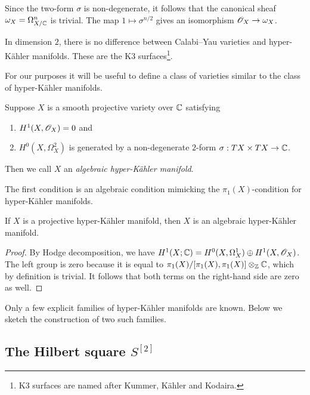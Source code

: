 \begin{remark}
Since the two-form $\sigma$ is non-degenerate, it follows that the canonical sheaf $\omega_X=\Omega_{X/\mathbb{C}}^n$ is trivial. The map $1 \mapsto \sigma^{n/2}$ gives an isomorphism $\mathscr{O}_X \to \omega_X$. 
\end{remark}

\begin{remark}
In dimension $2$, there is no difference between Calabi--Yau varieties and hyper-Kähler manifolds. These are the K3 surfaces\footnote{K3 surfaces are named after Kummer, Kähler and Kodaira.}. 
\end{remark}


For our purposes it will be useful to define a class of varieties similar to the class of hyper-Kähler manifolds.

\begin{definition}
Suppose $X$ is a smooth projective variety over $\mathbb{C}$ satisfying

\begin{enumerate}
\item $H^1(X,\mathscr{O}_X)=0$ and
\item $H^0(X,\Omega_X^2)$ is generated by a non-degenerate $2$-form $\sigma:TX \times TX \to \mathbb{C}$.
\end{enumerate}

Then we call $X$ an \emph{algebraic hyper-Kähler manifold}.
\end{definition}

The first condition is an algebraic condition mimicking the $\pi_1(X)$-condition for hyper-Kähler manifolds.

\begin{proposition}
If $X$ is a projective hyper-Kähler manifold, then $X$ is an algebraic hyper-Kähler manifold.
\end{proposition}
\begin{proof}
By Hodge decomposition, we have $H^1(X;\mathbb{C}) = H^0(X,\Omega^1_X) \oplus H^1(X,\mathscr{O}_X)$. The left group is zero because it is equal to $\pi_1(X)/[\pi_1(X),\pi_1(X)] \otimes_{\mathbb{Z}} \mathbb{C}$, which by definition is trivial. It follows that both terms on the right-hand side are zero as well.
\end{proof}

Only a few explicit families of hyper-Kähler manifolds are known. Below we sketch the construction of two such families.

\subsection{The Hilbert square $S^{[2]}$}

